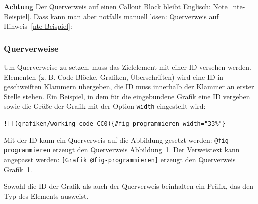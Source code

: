 \documentclass[
  letterpaper,
  DIV=11]{scrartcl}
\begin{document}
\textbf{Achtung} Der Querverweis auf einen Callout Block bleibt
Englisch: Note~\ref{nte-Beispiel}. Dass kann man aber notfalls manuell
lösen: Querverweis auf Hinweis~\ref{nte-Beispiel}:

\subsubsection{Querverweise}\label{Querverweise}

Um Querverweise zu setzen, muss das Zielelement mit einer ID versehen
werden. Elementen (z. B. Code-Blöcke, Grafiken, Überschriften) wird eine
ID in geschweiften Klammern übergeben, die ID muss innerhalb der Klammer
an erster Stelle stehen. Ein Beispiel, in dem für die eingebundene
Grafik eine ID vergeben sowie die Größe der Grafik mit der Option
\texttt{width} eingestellt wird:

\texttt{!{[}{]}(grafiken/working\_code\_CC0)\{\#fig-programmieren\ width="33\%"\}}

\begin{figure}


\caption{\label{fig-programmieren}}

\end{figure}%

Mit der ID kann ein Querverweis auf die Abbildung gesetzt werden:
\texttt{@fig-programmieren} erzeugt den Querverweis
Abbildung~\ref{fig-programmieren}. Der Verweistext kann angepasst
werden: \texttt{{[}Grafik\ @fig-programmieren{]}} erzeugt den
Querverweis Grafik~\ref{fig-programmieren}.

Sowohl die ID der Grafik als auch der Querverweis beinhalten ein Präfix,
das den Typ des Elements ausweist.
\end{document}
